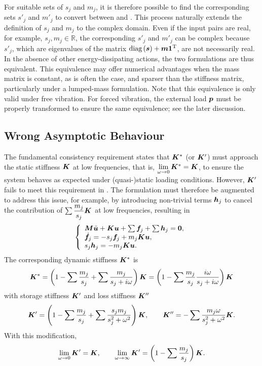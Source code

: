 For suitable sets of $s_j$ and $m_j$, it is therefore possible to find the corresponding sets $s'_j$ and $m'_j$ to convert between  and .
This process naturally extends the definition of $s_j$ and $m_j$ to the complex domain.
Even if the input pairs are real, for example, $s_j,m_j\in\mathbb{R}$, the corresponding $s'_j$ and $m'_j$ can be complex because $s'_j$, which are eigenvalues of the matrix $\text{diag}\left(\bm{s}\right)+\bm{m}\bm{1}^{\mathrm{T}}$, are not necessarily real.
In the absence of other energy-dissipating actions, the two formulations are thus equivalent.
This equivalence may offer numerical advantages when the mass matrix is constant, as is often the case, and sparser than the stiffness matrix, particularly under a lumped-mass formulation.
Note that this equivalence is only valid under free vibration.
For forced vibration, the external load $\bm{p}$ must be properly transformed to ensure the same equivalence; see the later discussion.
\subsection{Wrong Asymptotic Behaviour}\label{sec:fix}
The fundamental consistency requirement states that $\bm{K}^*$ (or $\bm{K}'$) must approach the static stiffness $\bm{K}$ at low frequencies, that is, $\lim\limits_{\omega\rightarrow0}\bm{K}^*=\bm{K}$, to ensure the system behaves as expected under (quasi-)static loading conditions.
However, $\bm{K}'$ fails to meet this requirement in .
The formulation must therefore be augmented to address this issue, for example, by introducing non-trivial terms $\bm{h}_j$ to cancel the contribution of $\sum\dfrac{m_j}{s_j}\bm{K}$ at low frequencies, resulting in
\begin{gather}\label{eq:u_right}
    \left\{\begin{array}{l}
        \bm{M}\ddot{\bm{u}}+\bm{K}\bm{u}+\sum\bm{f}_j+\sum\bm{h}_j=\bm{0}, \\
        \dot{\bm{f}}_j=-s_j\bm{f}_j+m_j\bm{K}\bm{u},\\
s_j\bm{h}_j=-m_j\bm{K}\bm{u}.
    \end{array}\right.
\end{gather}
The corresponding dynamic stiffness $\bm{K}^*$ is
\begin{gather}
    \bm{K}^*=\left(1-\sum\dfrac{m_j}{s_j}+\sum\dfrac{m_j}{s_j+i\omega}\right)\bm{K}=\left(1-\sum\dfrac{m_j}{s_j}\dfrac{i\omega}{s_j+i\omega}\right)\bm{K}
\end{gather}
with storage stiffness $\bm{K}'$ and loss stiffness $\bm{K}''$
\begin{gather}
    \bm{K}'=\left(1-\sum\dfrac{m_j}{s_j}+\sum\dfrac{s_jm_j}{s_j^2+\omega^2}\right)\bm{K},\qquad
    \bm{K}''=-\sum\dfrac{m_j\omega}{s_j^2+\omega^2}\bm{K}.
\end{gather}
With this modification,
\begin{gather}
    \lim\limits_{\omega\rightarrow0}\bm{K}'=\bm{K},\qquad
    \lim\limits_{\omega\rightarrow\infty}\bm{K}'=\left(1-\sum\dfrac{m_j}{s_j}\right)\bm{K}.
\end{gather}

